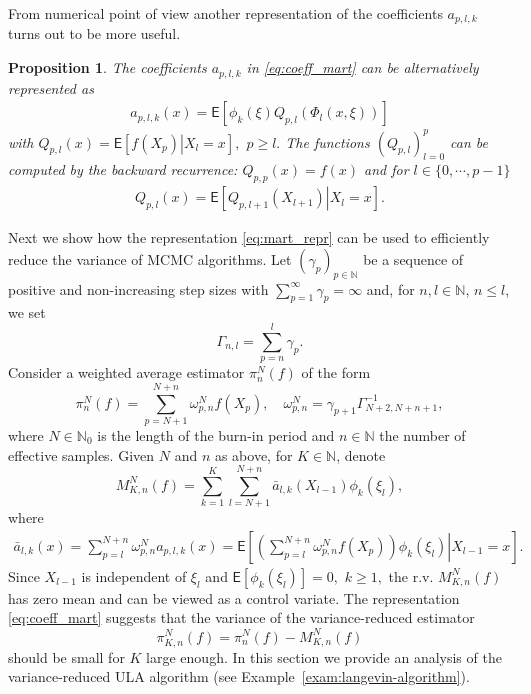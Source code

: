 \documentclass[bj]{imsart}
\newtheorem{prop}[thm]{Proposition}
\begin{document}
From  numerical point of view another representation of the coefficients \(a_{p,l,k}\)  turns out to be more useful.
\begin{prop}
The coefficients \(a_{p,l,k}\) in \eqref{eq:coeff_mart}  can be alternatively represented as
\begin{eqnarray*}
a_{p,l,k}(x)=\mathsf{E}\left[\phi_k\left(\xi\right)Q_{p,l}\left(\Phi_l(x,\xi)\right)\right]
\end{eqnarray*}
with \(Q_{p,l}(x)=\mathsf{E}\left[\left.f(X_{p})\right|X_{l}=x\right],\) \(p\geq l.\)
The functions \((Q_{p,l})_{l=0}^p\)  can be computed by the backward recurrence: $Q_{p,p}(x)=f(x)$ and for $l \in \{0,\cdots,p-1\}$
\begin{eqnarray}
\label{eq:qpl}
Q_{p,l}(x)=\mathsf{E}\left[\left.Q_{p,l+1}(X_{l+1})\right|X_{l}=x\right].
\end{eqnarray}
\end{prop}
\par
Next we show how  the representation \eqref{eq:mart_repr} can be used to efficiently reduce the variance of MCMC algorithms.  Let $(\gamma_{p})_{p\in\mathbb N}$ be a sequence of positive and non-increasing
step sizes
with $\sum_{p=1}^\infty \gamma_p=\infty$
and, for $n,l\in\mathbb{N}$, $n\le l$, we set
\[
\Gamma_{n,l}=\sum_{p=n}^{l}\gamma_{p}.
\]
 Consider a weighted average estimator $\pi_{n}^{N}(f)$ of the form
\begin{equation}\label{eq:29032018a2}
\pi_{n}^{N}(f)=\sum_{p=N+1}^{N+n}\omega_{p,n}^{N}f(X_{p}),\quad\omega_{p,n}^{N}=\gamma_{p+1}\Gamma_{N+2,N+n+1}^{-1},
\end{equation}
where $N\in\mathbb N_0$ is the length of the burn-in period and $n\in\mathbb N$
the number of effective samples.
Given $N$ and $n$ as above, for $K\in\mathbb N$, denote
\begin{equation}
M_{K,n}^N(f) =\sum_{k=1}^{K}\sum_{l=N+1}^{N+n}\bar a_{l,k}(X_{l-1})\phi_k(\xi_{l}),
\label{eq:29032018a5}
\end{equation}
where
\begin{align}
\label{eq:first-expression-bar-a-l-k}
\bar{a}_{l,k}(x)
=\sum_{p=l}^{N+n}\omega_{p,n}^{N}a_{p,l,k}(x)=\mathsf{E}\left[\left.\left(\sum_{p=l}^{N+n}\omega_{p,n}^{N}f(X_{p})\right)\phi_k(\xi_{l})\right|X_{l-1}=x\right].
\end{align}
Since \(X_{l-1}\) is independent of \(\xi_{l}\) and \(\mathsf{E}[\phi_k(\xi_{l})]=0,\) \(k\geq 1,\)  the r.v.  \(M_{K,n}^N(f)\) has zero mean and can be viewed as a control variate.
The representation \eqref{eq:coeff_mart} suggests that the variance of  the  variance-reduced estimator
\begin{equation}
\label{eq:29032018a3}
\pi_{K,n}^N(f)=\pi_n^N(f)-M_{K,n}^N(f)
\end{equation}
should be small for \(K\) large enough. In this section   we provide  an analysis of the variance-reduced ULA  algorithm (see Example~\ref{exam:langevin-algorithm}).
\end{document}
